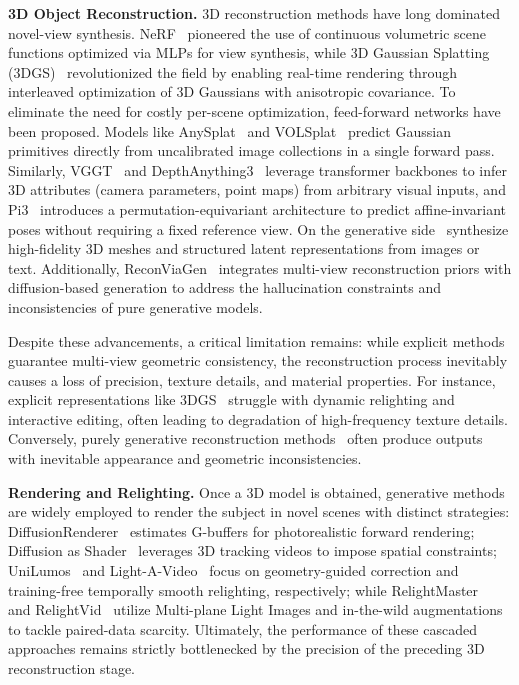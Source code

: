 \documentclass[runningheads]{llncs}
\begin{document}
\textbf{3D Object Reconstruction.} 3D reconstruction methods have long dominated novel-view synthesis. NeRF~\cite{nerf} pioneered the use of continuous volumetric scene functions optimized via MLPs for view synthesis, while 3D Gaussian Splatting (3DGS)~\cite{3dgs} revolutionized the field by enabling real-time rendering through interleaved optimization of 3D Gaussians with anisotropic covariance. To eliminate the need for costly per-scene optimization, feed-forward networks have been proposed. Models like AnySplat~\cite{anysplat} and VOLSplat~\cite{volsplat} predict Gaussian primitives directly from uncalibrated image collections in a single forward pass. Similarly, VGGT~\cite{vggt} and DepthAnything3~\cite{depthanything3} leverage transformer backbones to infer 3D attributes (camera parameters, point maps) from arbitrary visual inputs, and Pi3~\cite{pi3} introduces a permutation-equivariant architecture to predict affine-invariant poses without requiring a fixed reference view. On the generative side~\cite{hunyuan3d,triposg,trellis} synthesize high-fidelity 3D meshes and structured latent representations from images or text. Additionally, ReconViaGen~\cite{reconviagen} integrates multi-view reconstruction priors with diffusion-based generation to address the hallucination constraints and inconsistencies of pure generative models.

Despite these advancements, a critical limitation remains: while explicit methods guarantee multi-view geometric consistency, the reconstruction process inevitably causes a loss of precision, texture details, and material properties. For instance, explicit representations like 3DGS~\cite{3dgs} struggle with dynamic relighting and interactive editing, often leading to degradation of high-frequency texture details. Conversely, purely generative reconstruction methods~\cite{reconviagen} often produce outputs with inevitable appearance and geometric inconsistencies.

\textbf{Rendering and Relighting.} Once a 3D model is obtained, generative methods are widely employed to render the subject in novel scenes with distinct strategies: DiffusionRenderer~\cite{diffusionrenderer} estimates G-buffers for photorealistic forward rendering; Diffusion as Shader~\cite{das} leverages 3D tracking videos to impose spatial constraints; UniLumos~\cite{unilumos} and Light-A-Video~\cite{lightavideo} focus on geometry-guided correction and training-free temporally smooth relighting, respectively; while RelightMaster~\cite{relightmaster} and RelightVid~\cite{relightvid} utilize Multi-plane Light Images and in-the-wild augmentations to tackle paired-data scarcity. Ultimately, the performance of these cascaded approaches remains strictly bottlenecked by the precision of the preceding 3D reconstruction stage.
\end{document}
